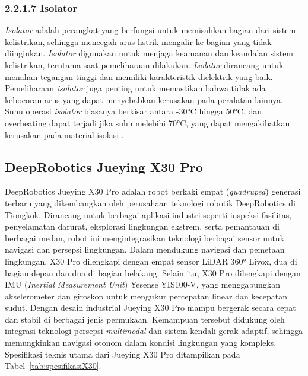 \subsubsection{2.2.1.7 Isolator}
\emph{Isolator} adalah perangkat yang berfungsi untuk memisahkan bagian dari sistem kelistrikan, sehingga mencegah arus listrik mengalir ke bagian yang tidak diinginkan. \emph{Isolator} digunakan untuk menjaga keamanan dan keandalan sistem kelistrikan, terutama saat pemeliharaan dilakukan. \emph{Isolator} dirancang untuk menahan tegangan tinggi dan memiliki karakteristik dielektrik yang baik. Pemeliharaan \emph{isolator} juga penting untuk memastikan bahwa tidak ada kebocoran arus yang dapat menyebabkan kerusakan pada peralatan lainnya. Suhu operasi \emph{isolator} biasanya berkisar antara -30°C hingga 50°C, dan overheating dapat terjadi jika suhu melebihi 70°C, yang dapat mengakibatkan kerusakan pada material isolasi \cite{Moreno2017}.

\subsection{DeepRobotics Jueying X30 Pro}
DeepRobotics Jueying X30 Pro adalah robot berkaki empat (\textit{quadruped}) generasi terbaru yang dikembangkan oleh perusahaan teknologi robotik DeepRobotics di Tiongkok. Dirancang untuk berbagai aplikasi industri seperti inspeksi fasilitas, penyelamatan darurat, eksplorasi lingkungan ekstrem, serta pemantauan di berbagai medan, robot ini mengintegrasikan teknologi berbagai sensor untuk navigasi dan persepsi lingkungan. Dalam mendukung navigasi dan pemetaan lingkungan, X30 Pro dilengkapi dengan empat sensor LiDAR 360° Livox, dua di bagian depan dan dua di bagian belakang. Selain itu, X30 Pro dilengkapi dengan IMU (\textit{Inertial Measurement Unit}) Yesense YIS100-V, yang menggabungkan akselerometer dan giroskop untuk mengukur percepatan linear dan kecepatan sudut. Dengan desain industrial Jueying X30 Pro mampu bergerak secara cepat dan stabil di berbagai jenis permukaan. Kemampuan tersebut didukung oleh integrasi teknologi persepsi \emph{multimodal} dan sistem kendali gerak adaptif, sehingga memungkinkan navigasi otonom dalam kondisi lingkungan yang kompleks. Spesifikasi teknis utama dari Jueying X30 Pro ditampilkan pada Tabel~\ref{tab:spesifikasiX30}.


